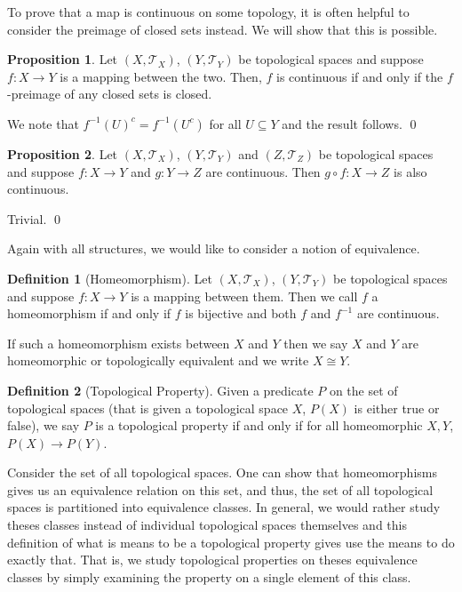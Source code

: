 \documentclass[
]{article}
\theoremstyle{definition}
\newtheorem{prop}{Proposition}
\theoremstyle{definition}
\newtheorem{definition}{Definition}[section]
\begin{document}
To prove that a map is continuous on some topology, it is often helpful
to consider the preimage of closed sets instead. We will show that this
is possible.

\begin{prop}
  Let \((X, \mathcal{T}_X)\), \((Y, \mathcal{T}_Y)\) be topological spaces and 
  suppose \(f : X \to Y\) is a mapping between the two. Then, \(f\) is continuous 
  if and only if the \(f\)-preimage of any closed sets is closed.
\end{prop}
\proof

We note that \(f^{-1}(U)^c = f^{-1}(U^c)\) for all \(U \subseteq Y\) and
the result follows. \qed

\begin{prop}
  Let \((X, \mathcal{T}_X)\), \((Y, \mathcal{T}_Y)\) and \((Z, \mathcal{T}_Z)\) 
  be topological spaces and suppose \(f : X \to Y\) and \(g : Y \to Z\) are 
  continuous. Then \(g \circ f : X \to Z\) is also continuous.
\end{prop}
\proof

Trivial. \qed

Again with all structures, we would like to consider a notion of
equivalence.

\begin{definition}[Homeomorphism]
  Let \((X, \mathcal{T}_X)\), \((Y, \mathcal{T}_Y)\) be topological spaces and 
  suppose \(f : X \to Y\) is a mapping between them. Then we call \(f\) a 
  homeomorphism if and only if \(f\) is bijective and both \(f\) and \(f^{-1}\) 
  are continuous. 

  If such a homeomorphism exists between \(X\) and \(Y\) then we say \(X\) and 
  \(Y\) are homeomorphic or topologically equivalent and we write \(X \cong Y\).
\end{definition}

\begin{definition}[Topological Property]
  Given a predicate \(P\) on the set of topological spaces (that is given 
  a topological space \(X\), \(P(X)\) is either true or false), we say \(P\) is 
  a topological property if and only if for all homeomorphic \(X, Y\), 
  \(P(X) \to P(Y)\).
\end{definition}

Consider the set of all topological spaces. One can show that
homeomorphisms gives us an equivalence relation on this set, and thus,
the set of all topological spaces is partitioned into equivalence
classes. In general, we would rather study theses classes instead of
individual topological spaces themselves and this definition of what is
means to be a topological property gives use the means to do exactly
that. That is, we study topological properties on theses equivalence
classes by simply examining the property on a single element of this
class.
\end{document}

